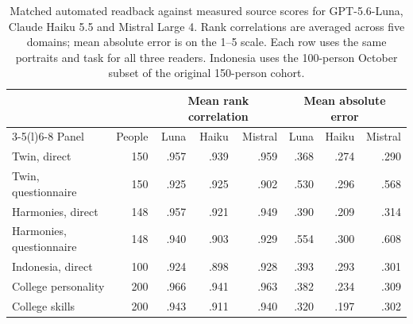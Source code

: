 \begin{table}[!t]
\centering\small
\begin{tabular}{@{}lrrrrrrr@{}}
\toprule
 & & \multicolumn{3}{c}{Mean rank correlation} & \multicolumn{3}{c}{Mean absolute error}\\
\cmidrule(lr){3-5}\cmidrule(l){6-8}
Panel & People & Luna & Haiku & Mistral & Luna & Haiku & Mistral\\
\midrule
Twin, direct & 150 & .957 & .939 & .959 & .368 & .274 & .290\\
Twin, questionnaire & 150 & .925 & .925 & .902 & .530 & .296 & .568\\
Harmonies, direct & 148 & .957 & .921 & .949 & .390 & .209 & .314\\
Harmonies, questionnaire & 148 & .940 & .903 & .929 & .554 & .300 & .608\\
Indonesia, direct & 100 & .924 & .898 & .928 & .393 & .293 & .301\\
College personality & 200 & .966 & .941 & .963 & .382 & .234 & .309\\
College skills & 200 & .943 & .911 & .940 & .320 & .197 & .302\\
\bottomrule
\end{tabular}
\caption{Matched automated readback against measured source scores for GPT-5.6-Luna, Claude Haiku 5.5 and Mistral Large 4. Rank correlations are averaged across five domains; mean absolute error is on the 1--5 scale. Each row uses the same portraits and task for all three readers. Indonesia uses the 100-person October subset of the original 150-person cohort.}
\label{tab:readers_ready}
\end{table}
